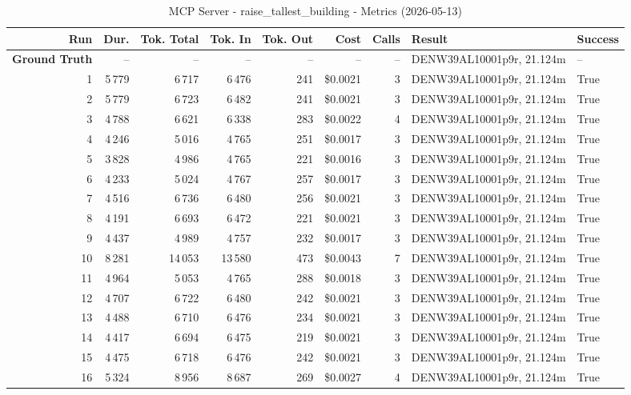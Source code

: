 \documentclass[a4paper,11pt]{article}
\begin{document}
\begin{table}[ht]
\centering
\scriptsize
\caption{MCP Server - raise\_tallest\_building - Metrics (2026-05-13)}
\label{tab:mcp\_raise\_tallest\_building\_metrics\_2026-05-13}
\begin{tabular}{r r r r r r r p{3cm} l}
\hline
Run & Dur. & Tok. Total & Tok. In & Tok. Out & Cost & Calls & Result & Success \\
\hline
\textbf{Ground Truth} & -- & -- & -- & -- & -- & -- & DENW39AL10001p9r, 21.124m & -- \\
\hline
1 & 5\,779 & 6\,717 & 6\,476 & 241 & \$0.0021 & 3 & DENW39AL10001p9r, 21.124m & True \\
2 & 5\,779 & 6\,723 & 6\,482 & 241 & \$0.0021 & 3 & DENW39AL10001p9r, 21.124m & True \\
3 & 4\,788 & 6\,621 & 6\,338 & 283 & \$0.0022 & 4 & DENW39AL10001p9r, 21.124m & True \\
4 & 4\,246 & 5\,016 & 4\,765 & 251 & \$0.0017 & 3 & DENW39AL10001p9r, 21.124m & True \\
5 & 3\,828 & 4\,986 & 4\,765 & 221 & \$0.0016 & 3 & DENW39AL10001p9r, 21.124m & True \\
6 & 4\,233 & 5\,024 & 4\,767 & 257 & \$0.0017 & 3 & DENW39AL10001p9r, 21.124m & True \\
7 & 4\,516 & 6\,736 & 6\,480 & 256 & \$0.0021 & 3 & DENW39AL10001p9r, 21.124m & True \\
8 & 4\,191 & 6\,693 & 6\,472 & 221 & \$0.0021 & 3 & DENW39AL10001p9r, 21.124m & True \\
9 & 4\,437 & 4\,989 & 4\,757 & 232 & \$0.0017 & 3 & DENW39AL10001p9r, 21.124m & True \\
10 & 8\,281 & 14\,053 & 13\,580 & 473 & \$0.0043 & 7 & DENW39AL10001p9r, 21.124m & True \\
11 & 4\,964 & 5\,053 & 4\,765 & 288 & \$0.0018 & 3 & DENW39AL10001p9r, 21.124m & True \\
12 & 4\,707 & 6\,722 & 6\,480 & 242 & \$0.0021 & 3 & DENW39AL10001p9r, 21.124m & True \\
13 & 4\,488 & 6\,710 & 6\,476 & 234 & \$0.0021 & 3 & DENW39AL10001p9r, 21.124m & True \\
14 & 4\,417 & 6\,694 & 6\,475 & 219 & \$0.0021 & 3 & DENW39AL10001p9r, 21.124m & True \\
15 & 4\,475 & 6\,718 & 6\,476 & 242 & \$0.0021 & 3 & DENW39AL10001p9r, 21.124m & True \\
16 & 5\,324 & 8\,956 & 8\,687 & 269 & \$0.0027 & 4 & DENW39AL10001p9r, 21.124m & True \\

\end{tabular}
\end{table}
\end{document}
